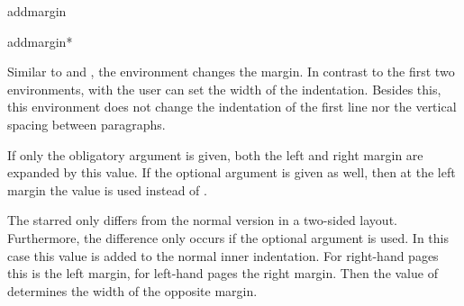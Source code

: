 \begin{Declaration}
  \begin{Environment}{addmargin}
  \end{Environment}
  \begin{Environment}{addmargin*}
  \end{Environment}
\end{Declaration}
Similar to  and %
%
, the  environment changes the margin.
In contrast to the first two environments, with  the
user can set the width of the indentation. Besides this, this environment does
not change the indentation of the first line nor the vertical spacing between
paragraphs.

If only the obligatory argument  is given, both the
left and right margin are expanded by this value. If the optional
argument  is given as well, then at the left
margin the value  is used instead of
.

The starred  only differs from the normal
version in a two-sided layout. Furthermore, the difference only occurs
if the optional argument  is used. In this
case this value  is added to the normal inner
indentation. For right-hand pages this is the left margin, for
left-hand pages the right margin. Then the value of
 determines the width of the opposite margin.

